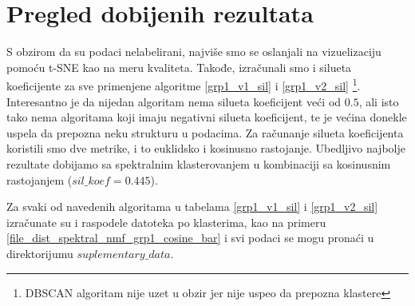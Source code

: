 \documentclass[a4paper]{article}
\begin{document}
\section{Pregled dobijenih rezultata}

S obzirom da su podaci nelabelirani, najviše smo se oslanjali na vizuelizaciju pomoću t-SNE kao na meru kvaliteta. Takođe, izračunali smo i silueta koeficijente za sve primenjene algoritme \ref{grp1_v1_sil} i \ref{grp1_v2_sil} \footnote{DBSCAN algoritam nije uzet u obzir jer nije uspeo da prepozna klastere}. Interesantno je da nijedan algoritam nema silueta koeficijent veći od $0.5$, ali isto tako nema algoritama koji imaju negativni silueta koeficijent, te je većina donekle uspela da prepozna neku strukturu u podacima. Za računanje silueta koeficijenta koristili smo dve metrike, i to euklidsko i kosinusno rastojanje. Ubedljivo najbolje rezultate dobijamo sa spektralnim klasterovanjem u kombinaciji sa kosinusnim rastojanjem ($sil\_koef = 0.445$).

Za svaki od navedenih algoritama u tabelama \ref{grp1_v1_sil} i \ref{grp1_v2_sil} izračunate su i raspodele datoteka po klasterima, kao na primeru \ref{file_dist_spektral_nmf_grp1_cosine_bar} i svi podaci se mogu pronaći u direktorijumu $suplementary\_data$.
\end{document}
